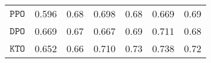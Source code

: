 \begin{table} [t]
{\begin{tabular}{crcrcrcrcrcrcr}
        \cmidrule(lr){1-2}
        \cmidrule(lr){3-6}
        \cmidrule(lr){7-10}
        \cmidrule(lr){11-14}

        
        \multicolumn{2}{c}{${\mathtt{PPO}}$}  & \multicolumn{2}{l}{0.596} & \multicolumn{2}{l}{0.68} & \multicolumn{2}{l}{0.698} & \multicolumn{2}{l}{0.68} & \multicolumn{2}{l}{0.669} & \multicolumn{2}{l}{0.69}\\
        
        \cmidrule(lr){1-2}
        \cmidrule(lr){3-6}
        \cmidrule(lr){7-10}
        \cmidrule(lr){11-14}
        
        \multicolumn{2}{c}{${\mathtt{DPO}}$} & \multicolumn{2}{l}{0.669} & \multicolumn{2}{l}{0.67} & \multicolumn{2}{l}{0.667} & \multicolumn{2}{l}{0.69}& \multicolumn{2}{l}{0.711} & \multicolumn{2}{l}{0.68} \\
        
        \cmidrule(lr){1-2}
        \cmidrule(lr){3-6}
        \cmidrule(lr){7-10}
        \cmidrule(lr){11-14}
        
        \multicolumn{2}{c}{${\mathtt{KTO}}$} & \multicolumn{2}{l}{0.652} & \multicolumn{2}{l}{0.66} & \multicolumn{2}{l}{0.710} & \multicolumn{2}{l}{0.73} & \multicolumn{2}{l}{0.738} & \multicolumn{2}{l}{0.72}\\
    
        
       

\end{tabular}}
\end{table}
